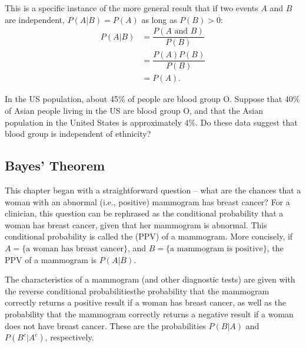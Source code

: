 This is a specific instance of the more general result that if two events $A$ and $B$ are independent, $P(A |B) = P(A)$ as long as $P(B) > 0$:
\begin{eqnarray*}
	P(A | B) &= \dfrac{P(A \text{ and } B)}{P(B)} \\
	     &= \dfrac{P(A) P(B)}{P(B)} \\
		 &= P(A).
\end{eqnarray*} 

\begin{exercisewrap}
\begin{nexercise}
In the US population, about 45\% of people are blood group O. Suppose that 40\% of Asian people living in the US are blood group O, and that the Asian population in the United States is approximately 4\%. Do these data suggest that blood group is independent of ethnicity?\footnotemark{}
\end{nexercise}
\end{exercisewrap}


\subsection{Bayes' Theorem}
\label{bayesTheoremSubsection}


This chapter began with a straightforward question -- what are the chances that a woman with an abnormal (i.e., positive) mammogram has breast cancer?  For a clinician, this question can be rephrased as the conditional probability  that a woman has breast cancer, given that her mammogram is abnormal. This conditional probability is called the  (PPV) of a mammogram. More concisely, if $A = \text{\{a woman has breast cancer\}}$, and $B = \text{\{a mammogram is  positive\}}$, the PPV of a mammogram is $P(A|B)$.

The characteristics of a mammogram (and other diagnostic tests) are given with the reverse conditional probabilities\textemdash  the probability that the mammogram correctly returns a positive result if a woman has breast cancer, as well as the probability that the mammogram correctly returns a negative result if a woman does not have breast cancer. These are the probabilities $P(B|A)$ and $P(B^c|A^c)$, respectively.

